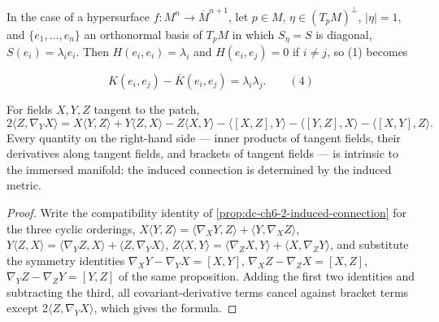 \begin{remark}
  \label{rem:dc-ch6-2-6}
  \leanok
  In the case of a hypersurface $f:M^n\to\overline{M}^{n+1}$, let $p\in M$,
  $\eta\in(T_pM)^\perp$, $|\eta|=1$, and $\{e_1,\dots,e_n\}$ an orthonormal basis of $T_pM$ in
  which $S_\eta=S$ is diagonal, $S(e_i)=\lambda_ie_i$. Then $H(e_i,e_i)=\lambda_i$
  and $H(e_i,e_j)=0$ if $i\neq j$, so (1) becomes
  
  $$
  K(e_i,e_j)-\overline{K}(e_i,e_j)=\lambda_i\lambda_j.\qquad(4)
  $$
\end{remark}

\begin{lemma}
  \label{lem:dc-ch6-2-7-koszul}
  \leanok
  For fields $X,Y,Z$ tangent to the patch,
  $$
  2\langle Z,\nabla_YX\rangle
    = X\langle Y,Z\rangle + Y\langle Z,X\rangle - Z\langle X,Y\rangle
      - \langle[X,Z],Y\rangle - \langle[Y,Z],X\rangle - \langle[X,Y],Z\rangle.
  $$
  Every quantity on the right-hand side — inner products of tangent fields,
  their derivatives along tangent fields, and brackets of tangent fields — is
  intrinsic to the immersed manifold: the induced connection is determined by
  the induced metric.
\end{lemma}
\begin{proof}
  \leanok
  Write the compatibility identity of \cref{prop:dc-ch6-2-induced-connection}
  for the three cyclic orderings,
  $X\langle Y,Z\rangle=\langle\nabla_XY,Z\rangle+\langle Y,\nabla_XZ\rangle$,
  $Y\langle Z,X\rangle=\langle\nabla_YZ,X\rangle+\langle Z,\nabla_YX\rangle$,
  $Z\langle X,Y\rangle=\langle\nabla_ZX,Y\rangle+\langle X,\nabla_ZY\rangle$,
  and substitute the symmetry identities
  $\nabla_XY-\nabla_YX=[X,Y]$, $\nabla_XZ-\nabla_ZX=[X,Z]$,
  $\nabla_YZ-\nabla_ZY=[Y,Z]$ of the same proposition. Adding the first two
  identities and subtracting the third, all covariant-derivative terms cancel
  against bracket terms except $2\langle Z,\nabla_YX\rangle$, which gives the
  formula.
\end{proof}


